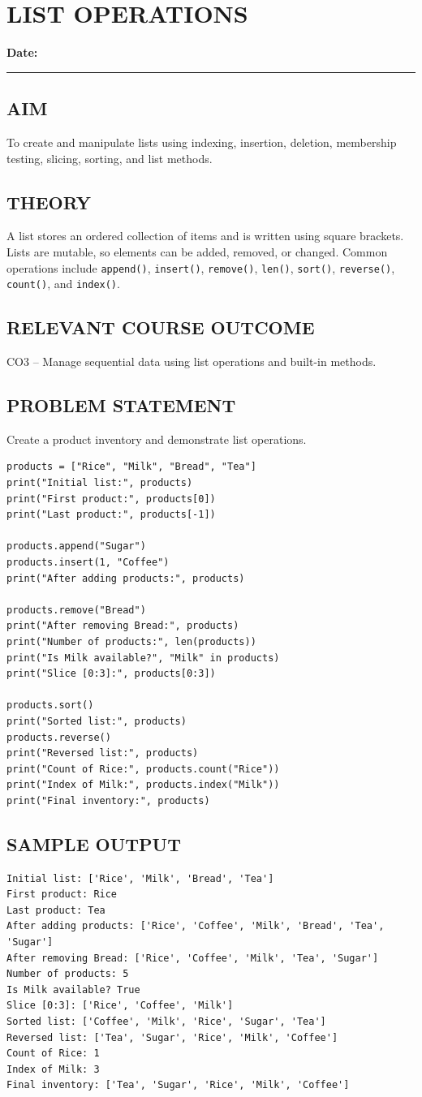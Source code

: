 \documentclass[12pt,a4paper]{report}
\newcommand{\experimentdate}{\hfill\textbf{Date:} \rule{3cm}{0.4pt}}
\newcommand{\aim}[1]{\section*{AIM}#1}
\newcommand{\courseoutcome}[1]{\section*{RELEVANT COURSE OUTCOME}#1}
\newcommand{\sampleoutput}{\section*{SAMPLE OUTPUT}}
\begin{document}
\chapter{LIST OPERATIONS}
\experimentdate

\aim{To create and manipulate lists using indexing, insertion, deletion, membership testing, slicing, sorting, and list methods.}

\section*{THEORY}
A list stores an ordered collection of items and is written using square brackets.
Lists are mutable, so elements can be added, removed, or changed. Common operations
include \texttt{append()}, \texttt{insert()}, \texttt{remove()}, \texttt{len()},
\texttt{sort()}, \texttt{reverse()}, \texttt{count()}, and \texttt{index()}.

\courseoutcome{CO3 -- Manage sequential data using list operations and built-in methods.}

\section*{PROBLEM STATEMENT}
Create a product inventory and demonstrate list operations.

\begin{lstlisting}
products = ["Rice", "Milk", "Bread", "Tea"]
print("Initial list:", products)
print("First product:", products[0])
print("Last product:", products[-1])

products.append("Sugar")
products.insert(1, "Coffee")
print("After adding products:", products)

products.remove("Bread")
print("After removing Bread:", products)
print("Number of products:", len(products))
print("Is Milk available?", "Milk" in products)
print("Slice [0:3]:", products[0:3])

products.sort()
print("Sorted list:", products)
products.reverse()
print("Reversed list:", products)
print("Count of Rice:", products.count("Rice"))
print("Index of Milk:", products.index("Milk"))
print("Final inventory:", products)
\end{lstlisting}

\sampleoutput
\begin{verbatim}
Initial list: ['Rice', 'Milk', 'Bread', 'Tea']
First product: Rice
Last product: Tea
After adding products: ['Rice', 'Coffee', 'Milk', 'Bread', 'Tea', 'Sugar']
After removing Bread: ['Rice', 'Coffee', 'Milk', 'Tea', 'Sugar']
Number of products: 5
Is Milk available? True
Slice [0:3]: ['Rice', 'Coffee', 'Milk']
Sorted list: ['Coffee', 'Milk', 'Rice', 'Sugar', 'Tea']
Reversed list: ['Tea', 'Sugar', 'Rice', 'Milk', 'Coffee']
Count of Rice: 1
Index of Milk: 3
Final inventory: ['Tea', 'Sugar', 'Rice', 'Milk', 'Coffee']
\end{verbatim}
\end{document}
